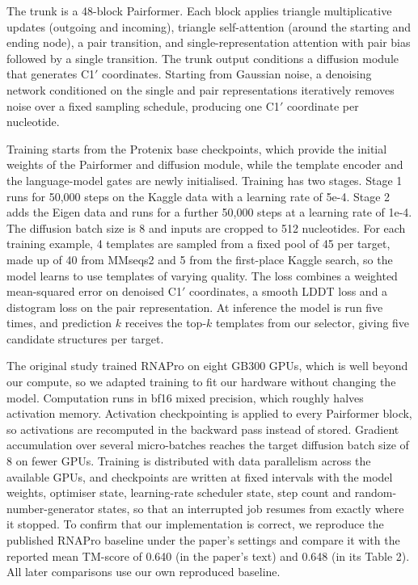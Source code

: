 \documentclass{FastFyp}
\begin{document}
The trunk is a 48-block Pairformer. Each block applies triangle multiplicative updates (outgoing and incoming), triangle self-attention (around the starting and ending node), a pair transition, and single-representation attention with pair bias followed by a single transition. The trunk output conditions a diffusion module that generates C1$'$ coordinates. Starting from Gaussian noise, a denoising network conditioned on the single and pair representations iteratively removes noise over a fixed sampling schedule, producing one C1$'$ coordinate per nucleotide.

Training starts from the Protenix base checkpoints, which provide the initial weights of the Pairformer and diffusion module, while the template encoder and the language-model gates are newly initialised. Training has two stages. Stage 1 runs for 50,000 steps on the Kaggle data with a learning rate of 5e-4. Stage 2 adds the Eigen data and runs for a further 50,000 steps at a learning rate of 1e-4. The diffusion batch size is 8 and inputs are cropped to 512 nucleotides. For each training example, 4 templates are sampled from a fixed pool of 45 per target, made up of 40 from MMseqs2 and 5 from the first-place Kaggle search, so the model learns to use templates of varying quality. The loss combines a weighted mean-squared error on denoised C1$'$ coordinates, a smooth LDDT loss and a distogram loss on the pair representation. At inference the model is run five times, and prediction $k$ receives the top-$k$ templates from our selector, giving five candidate structures per target.

The original study trained RNAPro on eight GB300 GPUs, which is well beyond our compute, so we adapted training to fit our hardware without changing the model. Computation runs in bf16 mixed precision, which roughly halves activation memory. Activation checkpointing is applied to every Pairformer block, so activations are recomputed in the backward pass instead of stored. Gradient accumulation over several micro-batches reaches the target diffusion batch size of 8 on fewer GPUs. Training is distributed with data parallelism across the available GPUs, and checkpoints are written at fixed intervals with the model weights, optimiser state, learning-rate scheduler state, step count and random-number-generator states, so that an interrupted job resumes from exactly where it stopped. To confirm that our implementation is correct, we reproduce the published RNAPro baseline under the paper's settings and compare it with the reported mean TM-score of 0.640 (in the paper's text) and 0.648 (in its Table 2). All later comparisons use our own reproduced baseline.
\end{document}
